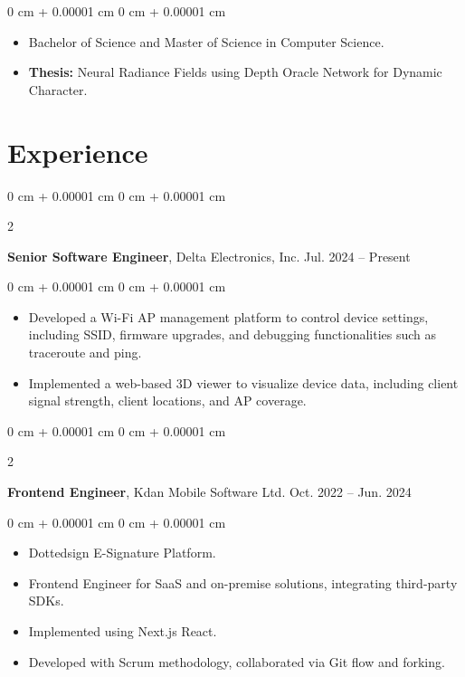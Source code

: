 \documentclass[10pt, letterpaper]{article}
\newenvironment{highlights}{
    \begin{itemize}[
        topsep=0.10 cm,
        parsep=0.10 cm,
        partopsep=0pt,
        itemsep=0pt,
        leftmargin=0 cm + 10pt
    ]
}{
    \end{itemize}
} %
\newenvironment{onecolentry}{
    \begin{adjustwidth}{
        0 cm + 0.00001 cm
    }{
        0 cm + 0.00001 cm
    }
}{
    \end{adjustwidth}
} %
\newenvironment{twocolentry}[2][]{
    \onecolentry
    \def\secondColumn{#2}
    \setcolumnwidth{\fill, 4.5 cm}
    \begin{paracol}{2}
}{
    \switchcolumn \raggedleft \secondColumn
    \end{paracol}
    \endonecolentry
} %
\begin{document}
        \vspace{0.10 cm}
        \begin{onecolentry}
            \begin{highlights}
                \item Bachelor of Science and Master of Science in Computer Science.
                \item \textbf{Thesis:} Neural Radiance Fields using Depth Oracle Network for Dynamic Character.
            \end{highlights}
        \end{onecolentry}
    
    \section{Experience}

        \begin{twocolentry}{
            Jul. 2024 – Present
        }
            \textbf{Senior Software Engineer}, Delta Electronics, Inc.\end{twocolentry}

        \vspace{0.10 cm}
        \begin{onecolentry}
            \begin{highlights}
                \item Developed a Wi-Fi AP management platform to control device settings, including SSID, firmware upgrades, and debugging functionalities such as traceroute and ping.
                \item Implemented a web-based 3D viewer to visualize device data, including client signal strength, client locations, and AP coverage.
            \end{highlights}
        \end{onecolentry}


        \vspace{0.2 cm}

        \begin{twocolentry}{
            Oct. 2022 – Jun. 2024
        }
            \textbf{Frontend Engineer}, Kdan Mobile Software Ltd.\end{twocolentry}

        \vspace{0.10 cm}
        \begin{onecolentry}
            \begin{highlights}
                \item Dottedsign E-Signature Platform.
                \item Frontend Engineer for SaaS and on-premise solutions, integrating third-party SDKs.
                \item Implemented using Next.js React.
                \item Developed with Scrum methodology, collaborated via Git flow and forking.
            \end{highlights}
        \end{onecolentry}
\end{document}
